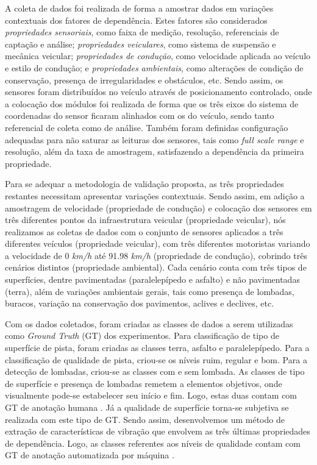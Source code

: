 A coleta de dados foi realizada de forma a amostrar dados em variações contextuais dos fatores de dependência. Estes fatores são considerados \emph{propriedades sensoriais}, como faixa de medição, resolução, referenciais de captação e análise; \emph{propriedades veiculares}, como sistema de suspensão e mecânica veicular; \emph{propriedades de condução}, como velocidade aplicada ao veículo e estilo de condução; e \emph{propriedades ambientais}, como alterações de condição de conservação, presença de irregularidades e obstáculos, etc. Sendo assim, os sensores foram distribuídos no veículo através de posicionamento controlado, onde a colocação dos módulos foi realizada de forma que os três eixos do sistema de coordenadas do sensor ficaram alinhados com os do veículo, sendo tanto referencial de coleta como de análise. Também foram definidas configuração adequadas para não saturar as leituras dos sensores, tais como \textit{full scale range} e resolução, além da taxa de amostragem, satisfazendo a dependência da primeira propriedade.

Para se adequar a metodologia de validação proposta, as três propriedades restantes necessitam apresentar variações contextuais. Sendo assim, em adição a amostragem de velocidade (propriedade de condução) e colocação dos sensores em três diferentes pontos da infraestrutura veicular (propriedade veicular), nós realizamos as coletas de dados com o conjunto de sensores aplicados a três diferentes veículos (propriedade veicular), com três diferentes motoristas variando a velocidade de 0 \emph{km/h} até 91.98 \emph{km/h} (propriedade de condução), cobrindo três cenários distintos (propriedade ambiental). Cada cenário conta com três tipos de superfícies, dentre pavimentadas (paralelepípedo e asfalto) e não pavimentadas (terra), além de variações ambientais gerais, tais como presença de lombadas, buracos, variação na conservação dos pavimentos, aclives e declives, etc.

Com os dados coletados, foram criadas as classes de dados a serem utilizadas como \textit{Ground Truth} (GT) dos experimentos. Para classificação de tipo de superfície de pista, foram criadas as classes terra, asfalto e paralelepípedo. Para a classificação de qualidade de pista, criou-se os níveis ruim, regular e bom. Para a detecção de lombadas, criou-se as classes com e sem lombada. As classes de tipo de superfície e presença de lombadas remetem a elementos objetivos, onde visualmente pode-se estabelecer seu início e fim. Logo, estas duas contam com GT de anotação humana \cite{Krig2014}. Já a qualidade de superfície torna-se subjetiva se realizada com este tipo de GT. Sendo assim, desenvolvemos um método de extração de características de vibração que envolvem as três últimas propriedades de dependência. Logo, as classes referentes aos níveis de qualidade contam com GT de anotação automatizada por máquina \cite{Krig2014}.

